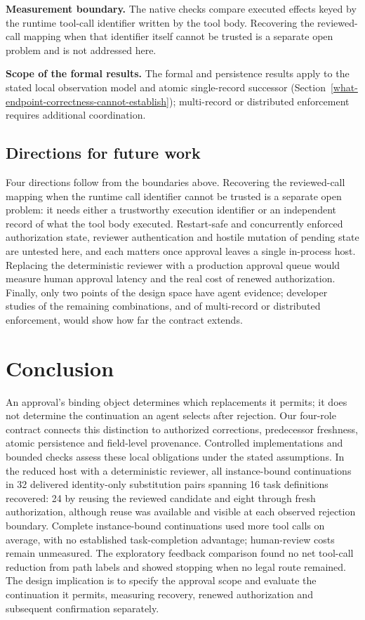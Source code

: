 \documentclass[pdflatex,sn-basic]{sn-jnl}
\begin{document}
\textbf{Measurement boundary.} The native checks compare executed effects keyed by the runtime tool-call identifier written by the tool body. Recovering the reviewed-call mapping when that identifier itself cannot be trusted is a separate open problem and is not addressed here.

\textbf{Scope of the formal results.} The formal and persistence results apply to the stated local observation model and atomic single-record successor (Section~\ref{what-endpoint-correctness-cannot-establish}); multi-record or distributed enforcement requires additional coordination.

\subsection{Directions for future work}\label{future-work}

Four directions follow from the boundaries above. Recovering the reviewed-call mapping when the runtime call identifier cannot be trusted is a separate open problem: it needs either a trustworthy execution identifier or an independent record of what the tool body executed. Restart-safe and concurrently enforced authorization state, reviewer authentication and hostile mutation of pending state are untested here, and each matters once approval leaves a single in-process host. Replacing the deterministic reviewer with a production approval queue would measure human approval latency and the real cost of renewed authorization. Finally, only two points of the design space have agent evidence; developer studies of the remaining combinations, and of multi-record or distributed enforcement, would show how far the contract extends.

\section{Conclusion}\label{conclusion}

An approval's binding object determines which replacements it permits; it does not determine the continuation an agent selects after rejection. Our four-role contract connects this distinction to authorized corrections, predecessor freshness, atomic persistence and field-level provenance. Controlled implementations and bounded checks assess these local obligations under the stated assumptions. In the reduced host with a deterministic reviewer, all instance-bound continuations in 32 delivered identity-only substitution pairs spanning 16 task definitions recovered: 24 by reusing the reviewed candidate and eight through fresh authorization, although reuse was available and visible at each observed rejection boundary. Complete instance-bound continuations used more tool calls on average, with no established task-completion advantage; human-review costs remain unmeasured. The exploratory feedback comparison found no net tool-call reduction from path labels and showed stopping when no legal route remained. The design implication is to specify the approval scope and evaluate the continuation it permits, measuring recovery, renewed authorization and subsequent confirmation separately.
\end{document}
